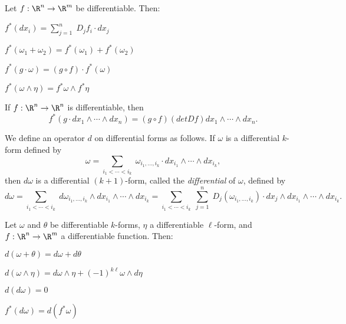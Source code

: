 \documentclass{book}
\begin{document}
\begin{theorem}  Let $f:\R^n\to\R^m$ be differentiable.  Then:
\begin{thmenm}
\item
$f^*(dx_i)=\sum_{j=1}^n\; D_jf_i\cdot dx_j$

\item
$f^*(\omega_1+\omega_2)=f^*(\omega_1)+f^*(\omega_2)$

\item
$f^*(g\cdot \omega)=(g\circ f)\cdot f^*(\omega)$

\item
$f^*(\omega\wedge\eta)=f^*\omega\wedge f^*\eta$
\end{thmenm}
\end{theorem}

\begin{theorem}  
If $f:\R^n\to\R^n$ is differentiable, then 
$$f^*(g\cdot dx_1\wedge\cdots\wedge dx_n)=(g\circ f)(det Df) dx_1\wedge\cdots\wedge dx_n.$$
\end{theorem}

\begin{definition}
We define an operator $d$ on differential forms as follows.  If $\omega$ is a differential
$k$-form defined by
$$\omega=\sum_{i_1< \cdots < i_k}\;\omega_{i_1,\ldots, i_k}\cdot dx_{i_1}\wedge\cdots
\wedge dx_{i_k},$$
then $d\omega$ is a differential $(k+1)$-form, called the {\em differential}
of $\omega$, defined by
$$d\omega=\sum_{i_1< \cdots < i_k}\;d\omega_{i_1,\ldots, i_k}\wedge dx_{i_1}\wedge\cdots
\wedge dx_{i_k}
=\sum_{i_1< \cdots < i_k}\;\sum_{j=1}^n\;D_j(\omega_{i_1,\ldots, i_k})\cdot dx_j \wedge dx_{i_1}\wedge\cdots
\wedge dx_{i_k}.$$
\end{definition}

\begin{theorem}  Let $\omega$ and $\theta$ be differentiable $k$-forms, 
$\eta$ a differentiable $\ell$-form,
and $f:\R^n\to\R^m$ a differentiable function.  Then:
\begin{thmenm}
\item
$d(\omega+\theta)=d\omega +d\theta$

\item
$d(\omega\wedge\eta)=d\omega\wedge\eta + (-1)^{k\ell}\omega\wedge d\eta$

\item
$d(d\omega)=0$

\item
$f^*(d\omega)=d(f^*\omega)$
\end{thmenm}
\end{theorem}
\end{document}
